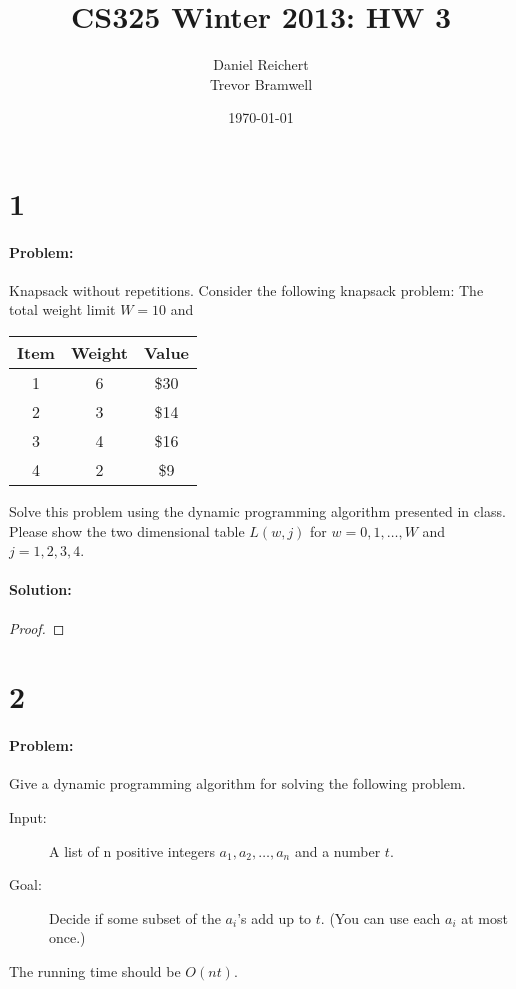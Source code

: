 \documentclass[12pt]{article}
\title{CS325 Winter 2013: HW 3}
\author{
    Daniel Reichert \\
    Trevor Bramwell \\
}
\date{\today}
\newcommand{\BigO}[1]{\ensuremath{O(#1)}}
\begin{document}
\maketitle
\section*{1}
\paragraph{Problem:}
Knapsack without repetitions. Consider the following knapsack problem:
The total weight limit $W = 10$ and \\
\begin{center}
\begin{tabular}{ c | c | c }
    Item & Weight & Value \\ \hline
    1 & 6 & \$30 \\
    2 & 3 & \$14 \\
    3 & 4 & \$16 \\
    4 & 2 & \$9  \\ \hline
\end{tabular}
\end{center}
Solve this problem using the dynamic programming algorithm presented in class. Please show the two
dimensional table $L(w, j)$ for $w = 0, 1, \dots, W$ and $j = 1, 2, 3, 4$.

\paragraph{Solution:}
\begin{proof}

\end{proof}

\section*{2}
\paragraph{Problem:}
Give a dynamic programming algorithm for solving the following problem.
\begin{description}
    \item [Input:] A list of n positive integers $a_1, a_2 , \dots, a_n$ and a number $t$.
    \item [Goal:] Decide if some subset of the $a_i$’s add up to $t$. (You can use each $a_i$ at most once.)
\end{description}
The running time should be $\BigO{nt}$.
\end{document}
